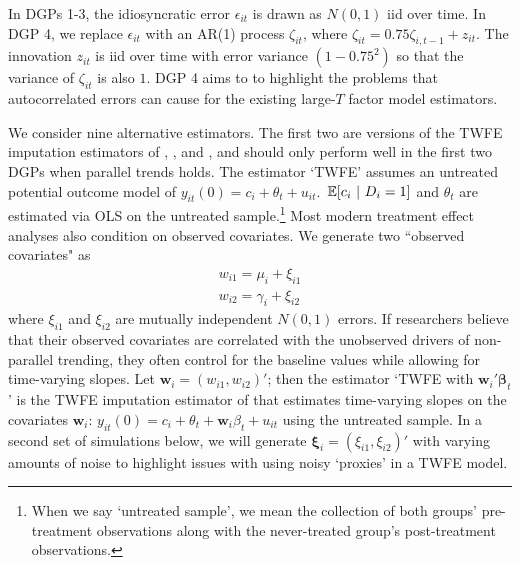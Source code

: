 \documentclass[12pt]{article}
\begin{document}
In DGPs 1-3, the idiosyncratic error $\epsilon_{it}$ is drawn as $N(0,1)$ iid over time. 
In DGP 4, we replace $\epsilon_{it}$ with an AR(1) process $\zeta_{it}$, where $\zeta_{it} = 0.75\zeta_{i,t-1} + z_{it}$. 
The innovation $z_{it}$ is iid over time with error variance $(1-0.75^2)$ so that the variance of $\zeta_{it}$ is also $1$.
DGP 4 aims to to highlight the problems that autocorrelated errors can cause for the existing large-$T$ factor model estimators. 


We consider nine alternative estimators. The first two are versions of the TWFE imputation estimators of \citet{Gardner_2021}, \citet{Wooldridge_2021}, and \cite{Borusyak_Jaravel_Spiess_2021}, and should only perform well in the first two DGPs when parallel trends holds. The estimator `TWFE' assumes an untreated potential outcome model of $y_{it}(0) = c_i + \theta_t + u_{it}$. $\expec{c_i}{D_i = 1}$ and $\theta_t$ are estimated via OLS on the untreated sample.\footnote{When we say `untreated sample', we mean the collection of both groups' pre-treatment observations along with the never-treated group's post-treatment observations.} Most modern treatment effect analyses also condition on observed covariates. We generate two ``observed covariates" as 
\begin{gather}
    w_{i1} = \mu_i + \xi_{i1}\\
    w_{i2} = \gamma_i + \xi_{i2}
\end{gather}
where $\xi_{i1}$ and $\xi_{i2}$ are mutually independent $N(0,1)$ errors. 
If researchers believe that their observed covariates are correlated with the unobserved drivers of non-parallel trending, they often control for the baseline values while allowing for time-varying slopes. Let $\bm w_i = (w_{i1}, w_{i2})'$; then the estimator `TWFE with $\bm w_i' \bm \beta_t$' is the TWFE imputation estimator of \citet{Borusyak_Jaravel_Spiess_2021} that estimates time-varying slopes on the covariates $\bm w_i$: $y_{it}(0) = c_i + \theta_t + \bm w_i \beta_t + u_{it}$ using the untreated sample. 
In a second set of simulations below, we will generate $\bm \xi_i = (\xi_{i1}, \xi_{i2})'$ with varying amounts of noise to highlight issues with using noisy `proxies' in a TWFE model.
\end{document}
